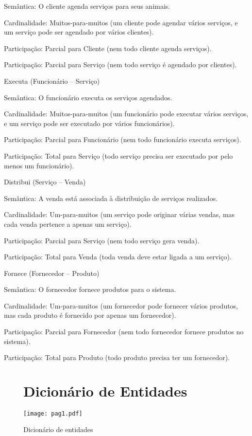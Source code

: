 \documentclass{article}
\begin{document}
Semântica: O cliente agenda serviços para seus animais. 

Cardinalidade: Muitos-para-muitos (um cliente pode agendar vários serviços, e um serviço pode ser agendado por vários clientes). 

Participação: Parcial para Cliente (nem todo cliente agenda serviços). 

Participação: Parcial para Serviço (nem todo serviço é agendado por clientes). 

Executa (Funcionário – Serviço) 

Semântica: O funcionário executa os serviços agendados. 

Cardinalidade: Muitos-para-muitos (um funcionário pode executar vários serviços, e um serviço pode ser executado por vários funcionários). 

Participação: Parcial para Funcionário (nem todo funcionário executa serviços). 

Participação: Total para Serviço (todo serviço precisa ser executado por pelo menos um funcionário). 

Distribui (Serviço – Venda) 

Semântica: A venda está associada à distribuição de serviços realizados. 

Cardinalidade: Um-para-muitos (um serviço pode originar várias vendas, mas cada venda pertence a apenas um serviço). 

Participação: Parcial para Serviço (nem todo serviço gera venda). 

Participação: Total para Venda (toda venda deve estar ligada a um serviço). 

Fornece (Fornecedor – Produto) 

Semântica: O fornecedor fornece produtos para o sistema. 

Cardinalidade: Um-para-muitos (um fornecedor pode fornecer vários produtos, mas cada produto é fornecido por apenas um fornecedor). 

Participação: Parcial para Fornecedor (nem todo fornecedor fornece produtos no sistema). 

Participação: Total para Produto (todo produto precisa ter um fornecedor). 
\begin{figure}

\section{Dicionário de Entidades}

    \centering
    \texttt{[image: pag1.pdf]}
    \caption{Dicionário de entidades}
    \label{fig:placeholder}
\end{figure}
\end{document}
